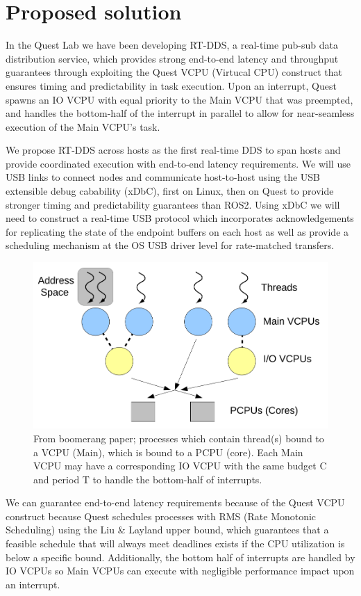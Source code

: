 \documentclass[11pt]{article}
\begin{document}
\section{Proposed solution}
\label{sec:org1299f81}
In the Quest Lab we have been developing RT-DDS, a real-time pub-sub data
distribution service, which provides strong end-to-end latency and throughput
guarantees through exploiting the Quest VCPU (Virtucal CPU) construct that
ensures timing and predictability in task execution. Upon an interrupt, Quest
spawns an IO VCPU with equal priority to the Main VCPU that was preempted, and
handles the bottom-half of the interrupt in parallel to allow for near-seamless
execution of the Main VCPU's task.

We propose RT-DDS across hosts as the first real-time DDS to span hosts and
provide coordinated execution with end-to-end latency requirements. We will
use USB links to connect nodes and communicate host-to-host using the
USB extensible debug cabability (xDbC), first on Linux, then on Quest to provide
stronger timing and predictability guarantees than ROS2. Using xDbC we will need
to construct a real-time USB protocol which incorporates acknowledgements for
replicating the state of the endpoint buffers on each host as well as provide
a scheduling mechanism at the OS USB driver level for rate-matched transfers.

\begin{figure}[htbp]
\centering
\includegraphics[width=.9\linewidth]{./vcpu_hierarchy.png}
\caption{\label{fig:org4b4b047}From boomerang paper; processes which contain thread(s) bound to a VCPU (Main), which is bound to a PCPU (core). Each Main VCPU may have a corresponding IO VCPU with the same budget C and period T to handle the bottom-half of interrupts.}
\end{figure}    

We can guarantee end-to-end latency requirements because of the Quest VCPU
construct because Quest schedules processes with RMS (Rate Monotonic Scheduling)
using the Liu \& Layland upper bound, which guarantees that a feasible schedule
that will always meet deadlines exists if the CPU utilization is below a specific
bound. Additionally, the bottom half of interrupts are handled by IO VCPUs
so Main VCPUs can execute with negligible performance impact upon an interrupt.
\end{document}
